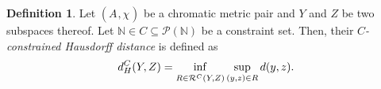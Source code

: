 \documentclass[8pt,a4paper,oneside,english,english]{article}
\theoremstyle{plain}
\theoremstyle
{plain}
\newtheorem{proposition}[theorem]{Proposition}%
\theoremstyle{definition}
\newtheorem{definition}[theorem]{Definition}%
\newcommand{\N}{\mathbb{N}}
\newcommand{\GH}{d_{GH}}
\newcommand{\MP}[1]{(A_{#1},\chi_{#1})}
\newcommand{\newinf}{\mathop{\mathrm{inf}\vphantom{\mathrm{sup}}}}
\DeclareMathOperator{\dis}{dis}
\begin{document}

\begin{definition}
	Let $\MP{}$ be a chromatic metric pair and $Y$ and $Z$ be two subspaces thereof. Let $\N\in C\subseteq\mathcal P(\N)$ be a constraint set. Then, their {\em $C$-constrained Hausdorff distance} is defined as
	\[
	d_H^C(Y,Z)=\newinf_{R\in\mathcal R^C(Y,Z)}\sup_{(y,z)\in R}d(y,z).
	\]
\end{definition}
\end{document}
